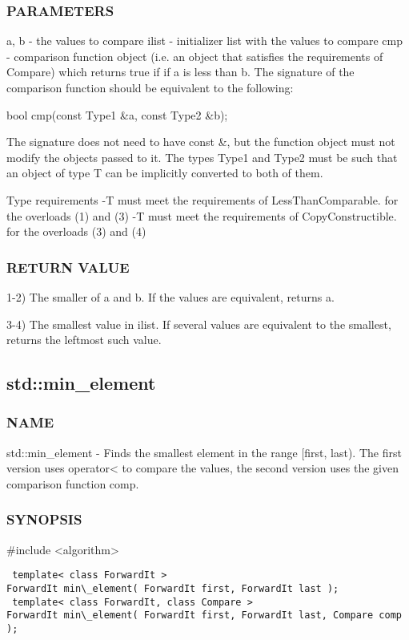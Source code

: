 \subsubsection{PARAMETERS}
a, b - the values to compare
ilist - initializer list with the values to compare
cmp - comparison function object (i.e. an object that satisfies the requirements of Compare) which returns true if  if a is less than b.
The signature of the comparison function should be equivalent to the following:

 bool cmp(const Type1 \&a, const Type2 \&b);

The signature does not need to have const \&, but the function object must not modify the objects passed to it.
The types Type1 and Type2 must be such that an object of type T can be implicitly converted to both of them.

 Type requirements
 -T must meet the requirements of LessThanComparable. for the overloads (1) and (3)
 -T must meet the requirements of CopyConstructible. for the overloads (3) and (4)

\subsubsection{RETURN VALUE}
1-2) The smaller of a and b. If the values are equivalent, returns a.

3-4) The smallest value in ilist. If several values are equivalent to the smallest, returns the leftmost such value.



\subsection{std::min\_element}

\subsubsection{NAME}
std::min\_element - Finds the smallest element in the range [first, last). The first version uses operator< to compare the values, the second version uses the given comparison function comp.

\subsubsection{SYNOPSIS}
\#include <algorithm>

\begin{lstlisting}
 template< class ForwardIt >
ForwardIt min\_element( ForwardIt first, ForwardIt last );
 template< class ForwardIt, class Compare >
ForwardIt min\_element( ForwardIt first, ForwardIt last, Compare comp );
\end{lstlisting}

